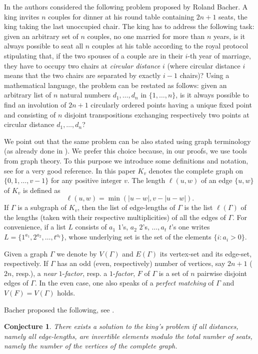 \documentclass{amsart}
\def\G{\Gamma}
\newtheorem{conj}{Conjecture}
\theoremstyle{definition}
\numberwithin{equation}{section}
\begin{document}
In \cite{PM} the authors considered the following problem proposed by Roland Bacher.
A king invites $n$ couples for dinner at his round table containing $2n+1$ seats, the king taking the last unoccupied chair.
The king has to address the following task: given an arbitrary set of $n$ couples, no one married for more than $n$ years,
is it always possible to seat all $n$ couples at his table according to the royal protocol stipulating that, if the two spouses of a couple are in their $i$-th year of marriage,
they have to occupy two chairs at \emph{circular distance} $i$ (where circular distance $i$ means that the two chairs are separated by exactly $i-1$ chairs)?
Using a mathematical language, the problem can be restated as follows:
given an arbitrary list of $n$ natural numbers $d_1,\ldots,d_n$ in $\{ 1,\ldots,n\}$, is it always possible to find an involution of
$2n+1$ circularly ordered points having a unique fixed point and consisting of $n$ disjoint transpositions exchanging respectively
two points at circular distance $d_1,\ldots,d_n$?

We point out that the same problem can be also stated using graph terminology (as already done in \cite{R}).
We prefer this choice because, in our proofs, we use tools from graph theory. To this purpose we introduce some definitions and notation,
see \cite{W} for a very good reference.
In this paper $K_v$ denotes the complete graph on $\{0,1,\ldots,v-1\}$ for any positive integer $v$.
The length $\ell(u, w)$ of an edge $\{u, w\}$ of $K_v$ is defined as
$$\ell(u, w) = \min(|u-w|, v-|u-w|).$$
If $\G$ is a subgraph of $K_v$, then the list of edge-lengths of $\G$ is the list $\ell(\G)$ of
the lengths (taken with their respective multiplicities) of all the edges of $\G$.
For convenience, if a list $L$ consists of $a_1$ $1$'s, $a_2$ $2$'s, $\ldots,  a_t$ $t$'s   one writes
$L=\{1^{a_1},2^{a_2},\ldots, t^{a_t} \}$, whose underlying set is the set of the elements $\{i : a_i>0\}$.

Given a graph $\G$ we denote by $V(\G)$ and $E(\G)$ its vertex-set and its edge-set, respectively.
If $\G$ has an odd (even, respectively) number of vertices, say $2n+1$ ($2n$, resp.), a \emph{near} $1$-\emph{factor}, resp. a $1$-\emph{factor}, $F$ of $\G$
is a set of $n$ pairwise disjoint edges of $\G$. In the even case, one also speaks of a \emph{perfect matching} of $\G$ and $V(F)=V(\G)$ holds.

Bacher proposed the following, see \cite{PM}.
\begin{conj}\label{Bacher}
There exists a solution to the king's problem if all distances, namely all edge-lengths, are invertible elements modulo the total number of seats, namely the number of the vertices of the complete graph.
\end{conj}
\end{document}
